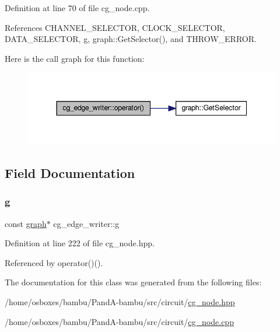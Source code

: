 Definition at line 70 of file cg\+\_\+node.\+cpp.



References C\+H\+A\+N\+N\+E\+L\+\_\+\+S\+E\+L\+E\+C\+T\+OR, C\+L\+O\+C\+K\+\_\+\+S\+E\+L\+E\+C\+T\+OR, D\+A\+T\+A\+\_\+\+S\+E\+L\+E\+C\+T\+OR, g, graph\+::\+Get\+Selector(), and T\+H\+R\+O\+W\+\_\+\+E\+R\+R\+OR.

Here is the call graph for this function\+:
\nopagebreak
\begin{figure}[H]
\begin{center}
\leavevmode
\includegraphics[width=344pt]{dd/db1/classcg__edge__writer_a58cc1053c3492554ccad8e6eb2dea459_cgraph}
\end{center}
\end{figure}


\subsection{Field Documentation}
\mbox{\label{classcg__edge__writer_a8b5beeba80a344f33fa5bf127b244f2f}} 
\subsubsection{\texorpdfstring{g}{g}}
{\footnotesize\ttfamily const \hyperlink{structgraph}{graph}$\ast$ cg\+\_\+edge\+\_\+writer\+::g\hspace{0.3cm}{\ttfamily [private]}}



Definition at line 222 of file cg\+\_\+node.\+hpp.



Referenced by operator()().



The documentation for this class was generated from the following files\+:\begin{DoxyCompactItemize}
\item 
/home/osboxes/bambu/\+Pand\+A-\/bambu/src/circuit/\hyperlink{cg__node_8hpp}{cg\+\_\+node.\+hpp}\item 
/home/osboxes/bambu/\+Pand\+A-\/bambu/src/circuit/\hyperlink{cg__node_8cpp}{cg\+\_\+node.\+cpp}\end{DoxyCompactItemize}
